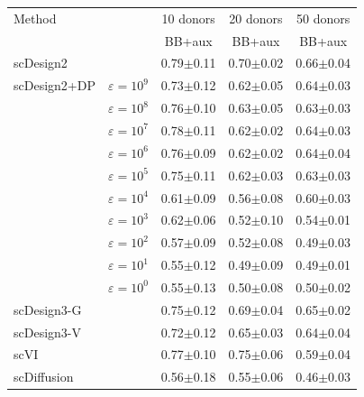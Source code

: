 \begin{tabular}{llccc}
\toprule
Method & & \multicolumn{1}{c}{10 donors} & \multicolumn{1}{c}{20 donors} & \multicolumn{1}{c}{50 donors} \\
 & & BB+aux & BB+aux & BB+aux \\
\midrule
scDesign2 &  & 0.79{\scriptsize$\pm$0.11} & 0.70{\scriptsize$\pm$0.02} & 0.66{\scriptsize$\pm$0.04} \\
\addlinespace[3pt]
scDesign2+DP & $\varepsilon=10^{9}$ & 0.73{\scriptsize$\pm$0.12} & 0.62{\scriptsize$\pm$0.05} & 0.64{\scriptsize$\pm$0.03} \\
 & $\varepsilon=10^{8}$ & 0.76{\scriptsize$\pm$0.10} & 0.63{\scriptsize$\pm$0.05} & 0.63{\scriptsize$\pm$0.03} \\
 & $\varepsilon=10^{7}$ & 0.78{\scriptsize$\pm$0.11} & 0.62{\scriptsize$\pm$0.02} & 0.64{\scriptsize$\pm$0.03} \\
 & $\varepsilon=10^{6}$ & 0.76{\scriptsize$\pm$0.09} & 0.62{\scriptsize$\pm$0.02} & 0.64{\scriptsize$\pm$0.04} \\
 & $\varepsilon=10^{5}$ & 0.75{\scriptsize$\pm$0.11} & 0.62{\scriptsize$\pm$0.03} & 0.63{\scriptsize$\pm$0.03} \\
 & $\varepsilon=10^{4}$ & 0.61{\scriptsize$\pm$0.09} & 0.56{\scriptsize$\pm$0.08} & 0.60{\scriptsize$\pm$0.03} \\
 & $\varepsilon=10^{3}$ & 0.62{\scriptsize$\pm$0.06} & 0.52{\scriptsize$\pm$0.10} & 0.54{\scriptsize$\pm$0.01} \\
 & $\varepsilon=10^{2}$ & 0.57{\scriptsize$\pm$0.09} & 0.52{\scriptsize$\pm$0.08} & 0.49{\scriptsize$\pm$0.03} \\
 & $\varepsilon=10^{1}$ & 0.55{\scriptsize$\pm$0.12} & 0.49{\scriptsize$\pm$0.09} & 0.49{\scriptsize$\pm$0.01} \\
 & $\varepsilon=10^{0}$ & 0.55{\scriptsize$\pm$0.13} & 0.50{\scriptsize$\pm$0.08} & 0.50{\scriptsize$\pm$0.02} \\
\addlinespace[3pt]
scDesign3-G &  & 0.75{\scriptsize$\pm$0.12} & 0.69{\scriptsize$\pm$0.04} & 0.65{\scriptsize$\pm$0.02} \\
\addlinespace[3pt]
scDesign3-V &  & 0.72{\scriptsize$\pm$0.12} & 0.65{\scriptsize$\pm$0.03} & 0.64{\scriptsize$\pm$0.04} \\
\addlinespace[3pt]
scVI &  & 0.77{\scriptsize$\pm$0.10} & 0.75{\scriptsize$\pm$0.06} & 0.59{\scriptsize$\pm$0.04} \\
\addlinespace[3pt]
scDiffusion &  & 0.56{\scriptsize$\pm$0.18} & 0.55{\scriptsize$\pm$0.06} & 0.46{\scriptsize$\pm$0.03} \\

\end{tabular}
